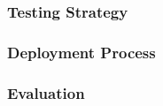 \subsubsection{Testing Strategy}


\subsubsection{Deployment Process}

\subsubsection{Evaluation }



%
%



%         
